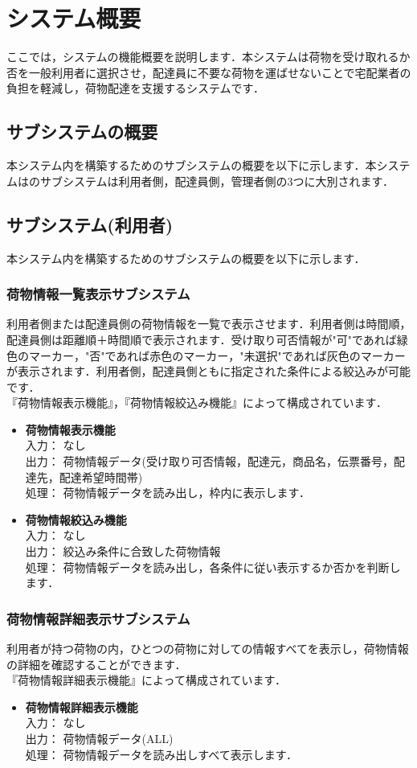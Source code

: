 \documentclass[a4j,titlepage]{jarticle}
\begin{document}
\section{システム概要}
ここでは，システムの機能概要を説明します．本システムは荷物を受け取れるか否を一般利用者に選択させ，配達員に不要な荷物を運ばせないことで宅配業者の負担を軽減し，荷物配達を支援するシステムです．

\subsection{サブシステムの概要}
本システム内を構築するためのサブシステムの概要を以下に示します．本システムはのサブシステムは利用者側，配達員側，管理者側の3つに大別されます．

\subsection{サブシステム(利用者)}
本システム内を構築するためのサブシステムの概要を以下に示します．

\subsubsection{荷物情報一覧表示サブシステム}
利用者側または配達員側の荷物情報を一覧で表示させます．利用者側は時間順，配達員側は距離順＋時間順で表示されます．受け取り可否情報が"可"であれば緑色のマーカー，"否"であれば赤色のマーカー，"未選択"であれば灰色のマーカーが表示されます．利用者側，配達員側ともに指定された条件による絞込みが可能です．\\
『荷物情報表示機能』，『荷物情報絞込み機能』によって構成されています．
\begin{itemize}
\item \textbf{荷物情報表示機能} \\
入力： なし \\
出力： 荷物情報データ(受け取り可否情報，配達元，商品名，伝票番号，配達先，配達希望時間帯)  \\
処理： 荷物情報データを読み出し，枠内に表示します．
\item \textbf{荷物情報絞込み機能} \\
入力： なし \\
出力： 絞込み条件に合致した荷物情報 \\
処理： 荷物情報データを読み出し，各条件に従い表示するか否かを判断します．
\end{itemize}

\subsubsection{荷物情報詳細表示サブシステム}
利用者が持つ荷物の内，ひとつの荷物に対しての情報すべてを表示し，荷物情報の詳細を確認することができます．\\
『荷物情報詳細表示機能』によって構成されています．
\begin{itemize}
\item \textbf{荷物情報詳細表示機能} \\
入力： なし \\
出力： 荷物情報データ(ALL) \\
処理： 荷物情報データを読み出しすべて表示します．
\end{itemize}
\end{document}
